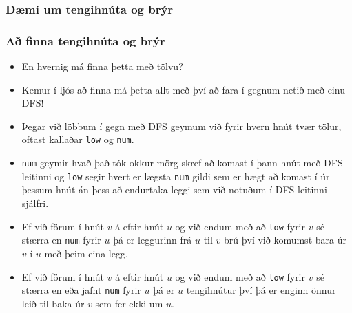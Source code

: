\documentclass{beamer}
\begin{document}
\begin{frame}
\frametitle{Dæmi um tengihnúta og brýr}

\begin{center}
\end{center}

\end{frame}

\begin{frame}[fragile]
\frametitle{Að finna tengihnúta og brýr}

\begin{itemize}

\item<1-> En hvernig má finna þetta með tölvu?

\item<2-> Kemur í ljós að finna má þetta allt með því að fara í gegnum netið með einu DFS!

\item<3-> Þegar við löbbum í gegn með DFS geymum við fyrir hvern hnút tvær tölur, oftast kallaðar \verb|low| og \verb|num|.

\item<4-> \verb|num| geymir hvað það tók okkur mörg skref að komast í þann hnút með DFS leitinni og \verb|low| segir hvert er lægsta \verb|num| gildi sem er hægt að komast í úr þessum hnút án þess að endurtaka leggi sem við notuðum í DFS leitinni sjálfri.

\item<5-> Ef við förum í hnút $v$ á eftir hnút $u$ og við endum með að \verb|low| fyrir $v$ sé stærra en \verb|num| fyrir $u$ þá er leggurinn frá $u$ til $v$ brú því við komumst bara úr $v$ í $u$ með þeim eina legg.

\item<6-> Ef við förum í hnút $v$ á eftir hnút $u$ og við endum með að \verb|low| fyrir $v$ sé stærra en eða jafnt \verb|num| fyrir $u$ þá er $u$ tengihnútur því þá er enginn önnur leið til baka úr $v$ sem fer ekki um $u$.

\end{itemize}

\end{frame}
\end{document}

